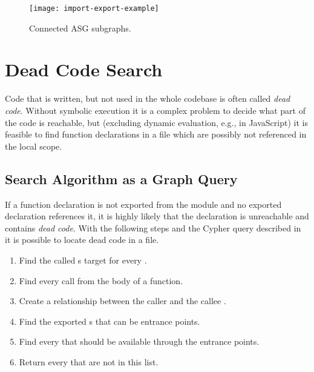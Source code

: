\begin{sidewaysfigure}[htbp]
  \centering
  \texttt{[image: import-export-example]}
  \caption{Connected ASG subgraphs.}
  \label{fig:import-export-example}
\end{sidewaysfigure}


\section{Dead Code Search}
\label{sect:dead-code-search}
Code that is written, but not used in the whole codebase is often called \emph{dead code}. Without symbolic execution it is a complex problem to decide what part of the code is reachable, but (excluding dynamic evaluation, e.g.,  in JavaScript) it is feasible to find function declarations in a file which are possibly not referenced in the local scope.

\subsection{Search Algorithm as a Graph Query}
If a function declaration is not exported from the module and no exported declaration references it, it is highly likely that the declaration is unreachable and contains \emph{dead code}. With the following steps and the Cypher query described in~ it is possible to locate dead code in a file.

\begin{enumerate}
	\item Find the called s target for every .
	\item Find every call from the body of a function.
	\item Create a  relationship between the caller and the callee .
	\item Find the exported s that can be entrance points.
	\item Find every  that should be available through the entrance points.
	\item Return every  that are not in this list.
\end{enumerate}

\begin{figure}[!htb]
	\begin{minipage}{\textwidth}
		
	\end{minipage}
\end{figure}

